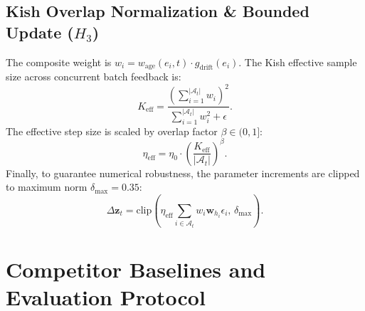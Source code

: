 \documentclass[10pt,journal,compsoc]{IEEEtran}
\begin{document}
\subsection{Kish Overlap Normalization \& Bounded Update ($H_3$)}
The composite weight is $w_i = w_{\text{age}}(e_i, t) \cdot g_{\text{drift}}(e_i)$. The Kish effective sample size across concurrent batch feedback is:
\begin{equation}
K_{\text{eff}} = \frac{\left( \sum_{i=1}^{|\mathcal{A}_t|} w_i \right)^2}{\sum_{i=1}^{|\mathcal{A}_t|} w_i^2 + \epsilon}.
\end{equation}
The effective step size is scaled by overlap factor $\beta \in (0, 1]$:
\begin{equation}
\eta_{\text{eff}} = \eta_0 \cdot \left( \frac{K_{\text{eff}}}{|\mathcal{A}_t|} \right)^\beta.
\end{equation}
Finally, to guarantee numerical robustness, the parameter increments are clipped to maximum norm $\delta_{\max} = 0.35$:
\begin{equation}
\Delta \mathbf{z}_t = \text{clip}\left( \eta_{\text{eff}} \sum_{i \in \mathcal{A}_t} w_i \mathbf{w}_{h_i} \epsilon_i, \, \delta_{\max} \right).
\end{equation}

\section{Competitor Baselines and Evaluation Protocol}
\end{document}
